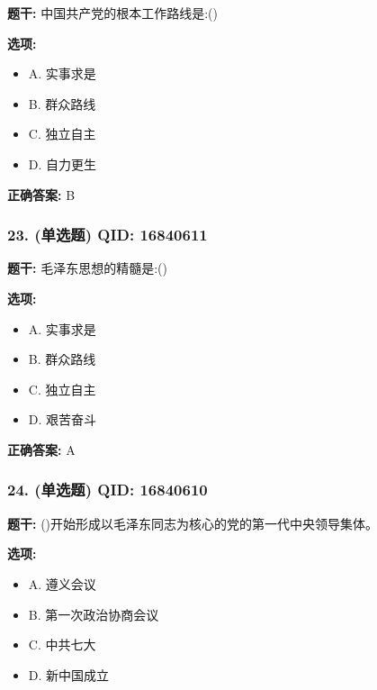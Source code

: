 \documentclass[12pt,UTF8]{ctexart}
\begin{document}
\textbf{题干:}
中国共产党的根本工作路线是:()

\textbf{选项:}
\begin{itemize}[leftmargin=*]

  \item A. 实事求是

  \item B. 群众路线

  \item C. 独立自主

  \item D. 自力更生

\end{itemize}

\textbf{正确答案:}
B

\vspace{0.3em}\hrulefill\vspace{0.7em}

\subsubsection*{23. (单选题) \small QID: 16840611}

\textbf{题干:}
毛泽东思想的精髓是:()

\textbf{选项:}
\begin{itemize}[leftmargin=*]

  \item A. 实事求是

  \item B. 群众路线

  \item C. 独立自主

  \item D. 艰苦奋斗

\end{itemize}

\textbf{正确答案:}
A

\vspace{0.3em}\hrulefill\vspace{0.7em}

\subsubsection*{24. (单选题) \small QID: 16840610}

\textbf{题干:}
()开始形成以毛泽东同志为核心的党的第一代中央领导集体。

\textbf{选项:}
\begin{itemize}[leftmargin=*]

  \item A. 遵义会议

  \item B. 第一次政治协商会议

  \item C. 中共七大

  \item D. 新中国成立

\end{itemize}
\end{document}
